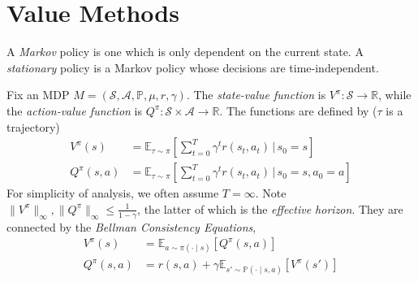\documentclass[11pt, letterpaper]{article}
\let\leq\leqslant
\begin{document}


\section{Value Methods}

\begin{concept}
    A \textit{Markov} policy is one which is only dependent on the current state. A \textit{stationary} policy is a Markov policy whose decisions are time-independent. 
\end{concept}

\begin{concept}
    Fix an MDP \(M = (\mathcal{S}, \mathcal{A}, \mathbb{P}, \mu, r, \gamma)\). The \textit{state-value function} is \(V^\pi : \mathcal{S} \to \mathbb{R}\), while the \textit{action-value function} is \(Q^\pi : \mathcal{S} \times \mathcal{A} \to \mathbb{R}\). The functions are defined by (\(\tau\) is a trajectory)
    \begin{align*}
        V^\pi(s) &= \mathbb{E}_{\tau \sim \pi} \left[ \sum_{t=0}^T \gamma^t r(s_t, a_t) \,\biggr\rvert\, s_0 = s \right] \\
        Q^\pi(s, a) &= \mathbb{E}_{\tau \sim \pi} \left[ \sum_{t=0}^T \gamma^t r(s_t, a_t) \,\biggr\rvert\, s_0 = s, a_0 = a \right]
    \end{align*}
    For simplicity of analysis, we often assume \(T = \infty\). Note \(\|V^\pi\|_{\infty}, \|Q^\pi\|_{\infty} \leq \frac{1}{1 - \gamma}\), the latter of which is the \textit{effective horizon}. They are connected by the \textit{Bellman Consistency Equations}, 
    \begin{align*}
        V^\pi(s) &= \mathbb{E}_{a \sim \pi(\cdot \mid s)} [Q^\pi(s, a)] \\
        Q^\pi(s, a) &= r(s, a) + \gamma \mathbb{E}_{s' \sim \mathbb{P}(\cdot \mid s, a)} [V^\pi(s')]
    \end{align*}
\end{concept}
\end{document}
